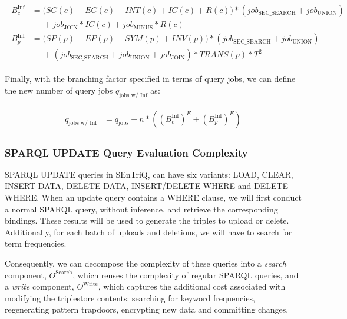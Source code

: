 \begin{align}
    \label{equation:branching-factors-updated}
    \begin{split}
        B^{\text{Inf}}_c &= \big( SC(c) + EC(c) + INT(c) + IC(c) + R(c) \big) * \left( job_{\text{SEC\_SEARCH}} + job_{\text{UNION}} \right) \\
        &\phantom{=} + job_{\text{JOIN}} * IC(c) + job_{\text{MINUS}} * R(c) \\
        B^{\text{Inf}}_p &= \big( SP(p) + EP(p) + SYM(p) + INV(p) \big) * \left( job_{\text{SEC\_SEARCH}} + job_{\text{UNION}} \right) \\
        &\phantom{=} + \left( job_{\text{SEC\_SEARCH}} + job_{\text{UNION}} + job_{\text{JOIN}} \right) * TRANS(p) * T^2
    \end{split}
\end{align}

\pagebreak

Finally, with the branching factor specified in terms of query jobs, we can define the new number of query jobs $q_{\text{jobs w/ Inf}}$ as:

\begin{align}
    \label{equation:query-jobs-growth}
    \begin{split}
        q_{\text{jobs w/ Inf}} &= q_{\text{jobs}} + n * ((B^{\text{Inf}}_c)^E + (B^{\text{Inf}}_p)^E)
    \end{split}
\end{align}

\subsubsection{SPARQL UPDATE Query Evaluation Complexity}

\gls{SPARQL} UPDATE queries in \gls{SEnTriQ}, can have six variants: LOAD, CLEAR, INSERT DATA, DELETE DATA, INSERT/DELETE WHERE and DELETE WHERE. When an update query contains a WHERE clause, we will first conduct a normal \gls{SPARQL} query, without inference, and retrieve the corresponding bindings. These results will be used to generate the triples to upload or delete. Additionally, for each batch of uploads and deletions, we will have to search for term frequencies. 

Consequently, we can decompose the complexity of these queries into a \emph{search} component, $O^{\text{Search}}$, which reuses the complexity of regular \gls{SPARQL} queries, and a \emph{write} component, $O^{\text{Write}}$, which captures the additional cost associated with modifying the triplestore contents: searching for keyword frequencies, regenerating pattern trapdoors, encrypting new data and committing changes.

